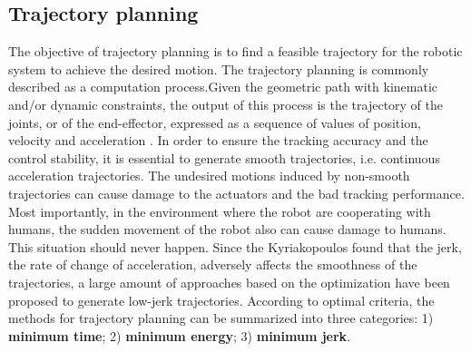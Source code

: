 
\subsection{Trajectory planning}
The objective of trajectory planning is to find a feasible trajectory for the robotic system to achieve the desired motion. The trajectory planning is commonly described as a computation process.Given the geometric path with kinematic and/or dynamic constraints, the output of this process is the trajectory of the joints, or of the end-effector, expressed as a sequence of values of position, velocity and acceleration \cite{siciliano2009}. In order to ensure the tracking accuracy and the control stability, it is essential to generate smooth trajectories, i.e. continuous acceleration trajectories. The undesired motions induced by non-smooth trajectories can cause damage to the actuators and the bad tracking performance. Most importantly, in the environment where the robot are cooperating with humans, the sudden movement of the robot also can cause damage to humans. This situation should never happen. Since the Kyriakopoulos \cite{kyriakopoulos1988} found that the jerk, the rate of change of acceleration, adversely affects the smoothness of the trajectories, a large amount of approaches based on the optimization have been proposed to generate low-jerk trajectories. According to optimal criteria, the methods for trajectory planning can be summarized into three categories: 1) \textbf{minimum time}; 2) \textbf{minimum energy}; 3) \textbf{minimum jerk}.

